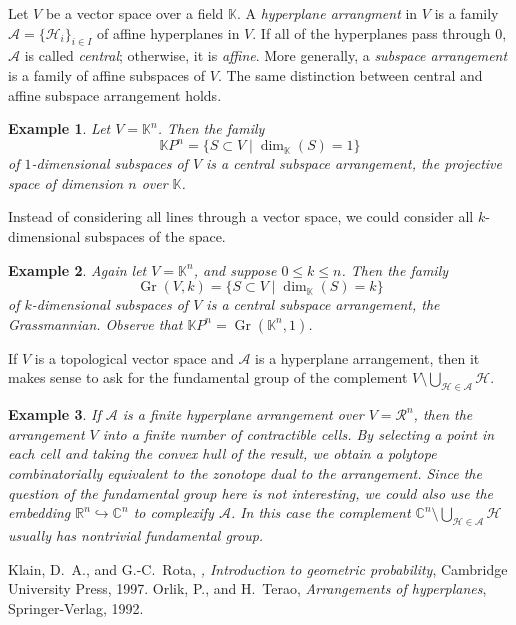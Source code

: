 \documentclass[12pt]{article}
\theoremstyle{plain}
\newtheorem{example}{Example}
\DeclareMathOperator{\Gr}{Gr}
\begin{document}
Let $V$ be a vector space over a field $\mathbb{K}$.  A 
{\em hyperplane arrangment} in $V$ is a family
$\mathcal{A}=\{\mathcal{H}_i\}_{i\in I}$
of affine hyperplanes in $V$.  If all of the hyperplanes
pass through $0$, $\mathcal{A}$ is called {\em central};
otherwise, it is {\em affine}.  More generally, a 
{\em subspace arrangement} is a family of affine subspaces of $V$. 
The same distinction between central and affine subspace arrangement
holds.

\begin{example}
Let $V=\mathbb{K}^n$.  Then the family
\[
\mathbb{K}P^n=\{S\subset V\mid\dim_{\mathbb{K}}(S)=1\}
\]
of $1$-dimensional subspaces of $V$ is a central subspace
arrangement, the projective space of dimension $n$ over 
$\mathbb{K}$.
\end{example}

Instead of considering all lines through a vector space, 
we could consider all $k$-dimensional subspaces
of the space.

\begin{example}
Again let $V=\mathbb{K}^n$, and suppose $0\le k\le n$.  Then the
family
\[
\Gr(V,k)=\{S\subset V\mid\dim_{\mathbb{K}}(S)=k\}
\]
of $k$-dimensional subspaces of $V$ is a central subspace
arrangement, the Grassmannian.  Observe that 
$\mathbb{K}P^n=\Gr(\mathbb{K}^n,1)$.
\end{example}

If $V$ is a topological vector space and $\mathcal{A}$ is a
hyperplane arrangement, then it makes sense to ask for the
fundamental group of the complement 
$V\setminus\bigcup_{\mathcal{H}\in\mathcal{A}}\mathcal{H}$.

\begin{example}
If $\mathcal{A}$ is a finite hyperplane arrangement over
$V=\mathcal{R}^n$, then the arrangement 
 $V$
into a finite number of contractible cells.  By selecting
a point in each cell and taking the convex hull of the result,
we obtain a polytope combinatorially equivalent to the 
zonotope dual to the arrangement.  Since the question of
the fundamental group here is not interesting, we could also
use the embedding $\mathbb{R}^n\hookrightarrow\mathbb{C}^n$
to complexify $\mathcal{A}$.  In this case the
complement 
$\mathbb{C}^n\setminus\bigcup_{\mathcal{H}\in\mathcal{A}}\mathcal{H}$
usually has nontrivial fundamental group.
\end{example}

\begin{thebibliography}{9}
Klain, D.\ A., and G.-C.\ Rota, {\em, Introduction to geometric probability},
Cambridge University Press, 1997.
Orlik, P., and H.\ Terao, {\em Arrangements of hyperplanes}, 
Springer-Verlag, 1992.
\end{thebibliography}
\end{document}
